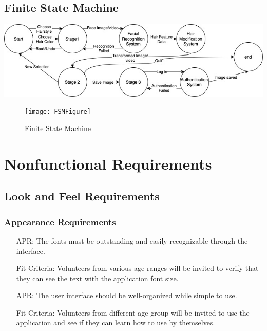 \documentclass[12pt]{article}
\newcounter{reqnum} %
\newcounter{aprreqnum} %
\begin{document}
\subsection{Finite State Machine}
\graphicspath{ {./fsm.jpg/} }
\includegraphics[width=\textwidth]{FSM}
\begin{figure}[h!]
\begin{center}
 \texttt{[image: FSMFigure]}
\caption{Finite State Machine}
\end{center}
\end{figure}


\section{Nonfunctional Requirements}

\subsection{Look and Feel Requirements}
\subsubsection{Appearance Requirements}
\begin{itemize}
    \item[APR\refstepcounter{aprreqnum}\theaprreqnum \label{R_Inputs}:] The fonts must be outstanding and easily recognizable through the interface.
    \item[] Fit Criteria: Volunteers from various age ranges will be invited to verify that they can see the text with the application font size.
    \item[APR\refstepcounter{aprreqnum}\theaprreqnum \label{R_Inputs}:] The user interface should be well-organized while simple to use. 
    \item[] Fit Criteria: Volunteers from different age group will be invited to use the application and see if they can learn how to use by themselves. 
\end{itemize}
\end{document}

